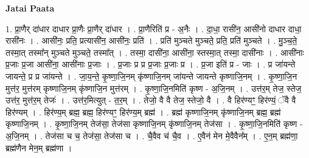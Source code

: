 \documentclass[17pt]{extarticle}
\begin{document}
\textbf{Jatai Paata} \newline

1. प्रा॒णैर् दा॑धार दाधार प्रा॒णैः प्रा॒णैर् दा॑धार । . प्रा॒णैरिति॑ प्र - अ॒नैः । . दा॒धा॒ रासी॑न॒ आसी॑नो दाधार दाधा॒ रासी॑नः । . आसी॑नः॒ प्रति॒ प्रत्यासी॑न॒ आसी॑नः॒ प्रति॑ । . प्रति॑ मुञ्चते मुञ्चते॒ प्रति॒ प्रति॑ मुञ्चते । . मु॒ञ्च॒ते॒ तस्मा॒त् तस्मा᳚न् मुञ्चते मुञ्चते॒ तस्मा᳚त् । . तस्मा॒ दासी॑ना॒ आसी॑ना॒ स्तस्मा॒त् तस्मा॒ दासी॑नाः । . आसी॑नाः प्र॒जाः प्र॒जा आसी॑ना॒ आसी॑नाः प्र॒जाः । . प्र॒जाः प्र प्र प्र॒जाः प्र॒जाः प्र । . प्र॒जा इति॑ प्र - जाः । . प्र जा॑यन्ते जायन्ते॒ प्र प्र जा॑यन्ते । . जा॒य॒न्ते॒ कृ॒ष्णा॒जि॒नम् कृ॑ष्णाजि॒नम् जा॑यन्ते जायन्ते कृष्णाजि॒नम् । . कृ॒ष्णा॒जि॒न मुत्त॑र॒ मुत्त॑रम् कृष्णाजि॒नम् कृ॑ष्णाजि॒न मुत्त॑रम् । . कृ॒ष्णा॒जि॒नमिति॑ कृष्ण - अ॒जि॒नम् । . उत्त॑र॒म् तेज॒ स्तेज॒ उत्त॑र॒ मुत्त॑र॒म् तेजः॑ । . उत्त॑र॒मित्युत् - त॒र॒म् । . तेजो॒ वै वै तेज॒ स्तेजो॒ वै । . वै हिर॑ण्यꣳ॒॒ हिर॑ण्यं॒ ॅवै वै हिर॑ण्यम् । . हिर॑ण्य॒म् ब्रह्म॒ ब्रह्म॒ हिर॑ण्यꣳ॒॒ हिर॑ण्य॒म् ब्रह्म॑ । . ब्रह्म॑ कृष्णाजि॒नम् कृ॑ष्णाजि॒नम् ब्रह्म॒ ब्रह्म॑ कृष्णाजि॒नम् । . कृ॒ष्णा॒जि॒नम् तेज॑सा॒ तेज॑सा कृष्णाजि॒नम् कृ॑ष्णाजि॒नम् तेज॑सा । . कृ॒ष्णा॒जि॒नमिति॑ कृष्ण - अ॒जि॒नम् । . तेज॑सा च च॒ तेज॑सा॒ तेज॑सा च । . चै॒वैव च॑ चै॒व । . ए॒वैन॑ मेन मे॒वैवैन᳚म् । . ए॒न॒म् ब्रह्म॑णा॒ ब्रह्म॑णैन मेन॒म् ब्रह्म॑णा । \newline
\end{document}
